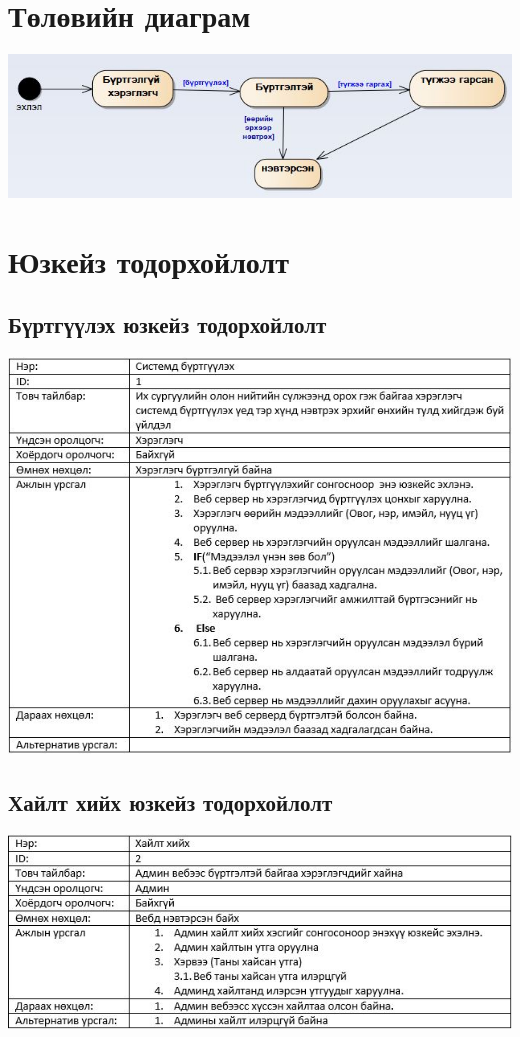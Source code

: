 \documentclass[
oneside, %
english, %
onehalfspacing, %
nolistspacing, %
headsepline, %
]{article} %
\begin{document}
      \section{Төлөвийн диаграм }
     \includegraphics[width=\textwidth]{statechartDiagram}
     \section{Юзкейз тодорхойлолт }
      \subsection{Бүртгүүлэх юзкейз тодорхойлолт }
     \includegraphics[width=\textwidth]{usecaseT}
      \subsection{Хайлт хийх юзкейз тодорхойлолт}
     \includegraphics[width=\textwidth]{usecaseT2}
\end{document}

